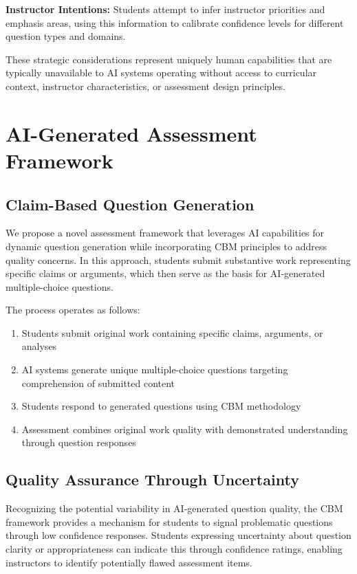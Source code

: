 \documentclass[sigconf]{acmart}
\begin{document}
\textbf{Instructor Intentions:} Students attempt to infer instructor priorities and emphasis areas, using this information to calibrate confidence levels for different question types and domains.

These strategic considerations represent uniquely human capabilities that are typically unavailable to AI systems operating without access to curricular context, instructor characteristics, or assessment design principles.

\section{AI-Generated Assessment Framework}

\subsection{Claim-Based Question Generation}

We propose a novel assessment framework that leverages AI capabilities for dynamic question generation while incorporating CBM principles to address quality concerns. In this approach, students submit substantive work representing specific claims or arguments, which then serve as the basis for AI-generated multiple-choice questions.

The process operates as follows:
\begin{enumerate}
\item Students submit original work containing specific claims, arguments, or analyses
\item AI systems generate unique multiple-choice questions targeting comprehension of submitted content
\item Students respond to generated questions using CBM methodology
\item Assessment combines original work quality with demonstrated understanding through question responses
\end{enumerate}

\subsection{Quality Assurance Through Uncertainty}

Recognizing the potential variability in AI-generated question quality, the CBM framework provides a mechanism for students to signal problematic questions through low confidence responses. Students expressing uncertainty about question clarity or appropriateness can indicate this through confidence ratings, enabling instructors to identify potentially flawed assessment items.
\end{document}
